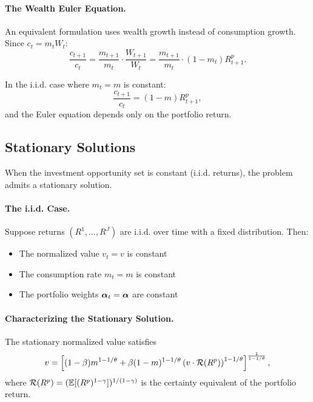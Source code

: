 \paragraph{The Wealth Euler Equation.}

An equivalent formulation uses wealth growth instead of consumption growth. Since $c_t = m_t W_t$:
\begin{equation}
\frac{c_{t+1}}{c_t} = \frac{m_{t+1}}{m_t} \cdot \frac{W_{t+1}}{W_t} = \frac{m_{t+1}}{m_t} \cdot (1-m_t) R_{t+1}^p.
\label{eq:consumption-growth}
\end{equation}

In the i.i.d. case where $m_t = m$ is constant:
\begin{equation}
\frac{c_{t+1}}{c_t} = (1-m) R_{t+1}^p,
\label{eq:consumption-growth-iid}
\end{equation}
and the Euler equation depends only on the portfolio return.

\subsection{Stationary Solutions}
\label{subsec:stationary}

When the investment opportunity set is constant (i.i.d. returns), the problem admits a stationary solution.

\paragraph{The i.i.d. Case.}

Suppose returns $(R^1, \ldots, R^J)$ are i.i.d. over time with a fixed distribution. Then:
\begin{itemize}[nosep]
    \item The normalized value $v_t = v$ is constant
    \item The consumption rate $m_t = m$ is constant
    \item The portfolio weights $\boldsymbol{\alpha}_t = \boldsymbol{\alpha}$ are constant
\end{itemize}

\paragraph{Characterizing the Stationary Solution.}

The stationary normalized value satisfies
\begin{equation}
v = \left[ (1-\beta) m^{1-1/\theta} + \beta (1-m)^{1-1/\theta} \left( v \cdot \mathcal{R}(R^p) \right)^{1-1/\theta} \right]^{\frac{1}{1-1/\theta}},
\label{eq:stationary-v}
\end{equation}
where $\mathcal{R}(R^p) = (\mathbb{E}[(R^p)^{1-\gamma}])^{1/(1-\gamma)}$ is the certainty equivalent of the portfolio return.

